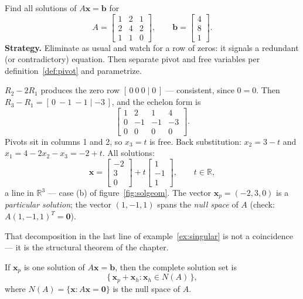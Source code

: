 \begin{example}\label{ex:singular}
Find all solutions of $A\mathbf{x}=\mathbf{b}$ for
\[
  A=\begin{bmatrix} 1 & 2 & 1\\ 2 & 4 & 2\\ 1 & 1 & 0\end{bmatrix},
  \qquad \mathbf{b}=\begin{bmatrix} 4\\ 8\\ 1\end{bmatrix}.
\]
\textbf{Strategy.} Eliminate as usual and watch for a row of zeros: it signals a redundant (or contradictory) equation. Then separate pivot and free variables per definition~\ref{def:pivot} and parametrize.
\begin{solution}
$R_2-2R_1$ produces the zero row $[\,0\ 0\ 0\mid0\,]$ — consistent, since $0=0$. Then $R_3-R_1=[\,0\ -1\ -1\mid-3\,]$, and the echelon form is
\[
  \left[\begin{array}{ccc|c} 1 & 2 & 1 & 4\\ 0 & -1 & -1 & -3\\ 0 & 0 & 0 & 0\end{array}\right].
\]
Pivots sit in columns 1 and 2, so $x_3=t$ is free. Back substitution: $x_2=3-t$ and $x_1=4-2x_2-x_3=-2+t$. All solutions:
\[
  \mathbf{x} = \begin{bmatrix} -2\\ 3\\ 0\end{bmatrix} + t\begin{bmatrix} 1\\ -1\\ 1\end{bmatrix},
  \qquad t\in\mathbb{R},
\]
a line in $\mathbb{R}^3$ — case (b) of figure~\ref{fig:solgeom}. The vector $\mathbf{x}_p=(-2,3,0)$ is a \emph{particular solution}; the vector $(1,-1,1)$ spans the \emph{null space} of $A$ (check: $A(1,-1,1)^{T}=\mathbf{0}$).
\end{solution}
\end{example}

That decomposition in the last line of example~\ref{ex:singular} is not a coincidence — it is the structural theorem of the chapter.

\begin{theorem}\label{thm:affinesol}
If $\mathbf{x}_p$ is one solution of $A\mathbf{x}=\mathbf{b}$, then the complete solution set is
\[
  \{\,\mathbf{x}_p + \mathbf{x}_h : \mathbf{x}_h \in N(A)\,\},
\]
where $N(A)=\{\mathbf{x}:A\mathbf{x}=\mathbf{0}\}$ is the null space of $A$.
\end{theorem}

